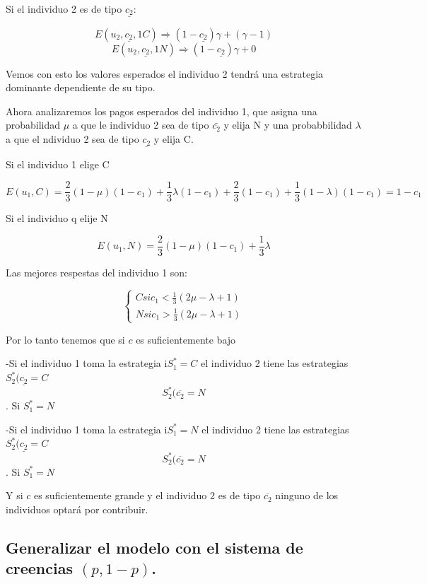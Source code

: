 \documentclass{article}
\begin{document}
Si el individuo 2 es de tipo $\underline{c_2}$:

$$E(u_2,\underline{c_2},1C)\Longrightarrow (1-\underline{c_2})\gamma+(\gamma-1)$$
$$E(u_2,\underline{c_2},1N)\Longrightarrow (1-\underline{c_2})\gamma+0$$

Vemos con esto los valores esperados el individuo 2 tendr\'a una estrategia dominante dependiente de su tipo.

Ahora analizaremos los pagos esperados del individuo 1, que asigna una probabilidad $\mu$ a que le individuo 2 sea de tipo $\bar{c_2}$ y elija N y una probabbilidad $\lambda$ a que el ndividuo 2 sea de tipo $\underline{c_2}$ y elija C.

Si el individuo 1 elige C 

$$E(u_1,C)=\frac{2}{3}(1-\mu)(1-c_1)+\frac{1}{3}\lambda(1-c_1)+\frac{2}{3}(1-c_1)+\frac{1}{3}(1-\lambda)(1-c_1)=1-c_1$$

Si el individuo q elije N

$$E(u_1,N)=\frac{2}{3}(1-\mu)(1-c_1)+\frac{1}{3}\lambda$$

Las mejores respestas del individuo 1 son:

$$\left\{ \begin{array}{c} C si c_1<\frac{1}{3}(2\mu-\lambda+1) \\ N si c_1>\frac{1}{3}(2\mu-\lambda+1)\end{array}\right. $$


Por lo tanto tenemos que si $c$ es suficientemente bajo

-Si el individuo 1 toma la estrategia  i$S_1^*=C$ el individuo 2 tiene las estrategias $S_2^*(\underline{c_2}=C$ $$S_2^*(\overline{c_2}=N$$. Si $S_1^*=N$ 

-Si el individuo 1 toma la estrategia  i$S_1^*=N$ el individuo 2 tiene las estrategias $S_2^*(\underline{c_2}=C$ $$S_2^*(\overline{c_2}=N$$. Si $S_1^*=N$ 


Y si $c$ es suficientemente grande y el individuo 2 es de tipo $\overline{c_2}$ ninguno de los individuos optar\'a por contribuir.



\subsection{Generalizar el modelo con el sistema de creencias $(p,1-p)$.}

\
\end{document}
